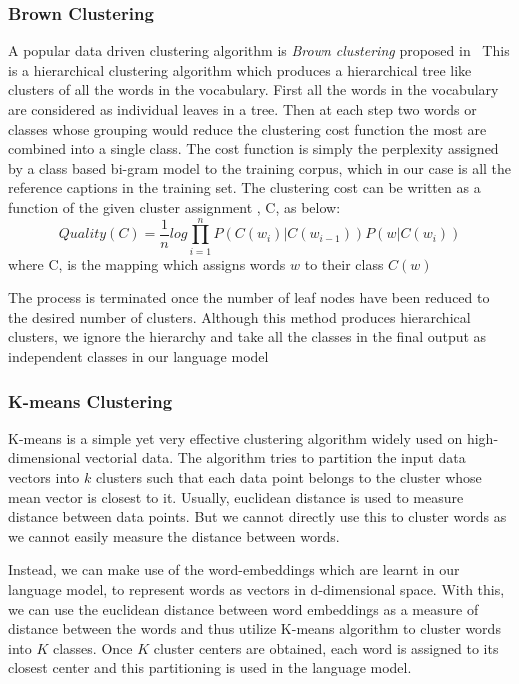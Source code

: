 \subsubsection*{Brown Clustering}
A popular data driven clustering algorithm is \emph{Brown clustering} proposed
in~\cite{BrownClust}
This is a hierarchical clustering algorithm which produces a hierarchical tree
like clusters of all the words in the vocabulary.
First all the words in the vocabulary are considered as individual leaves in a
tree. 
Then at each step two words or classes whose grouping would reduce the clustering
cost function the most are combined into a single class.
The cost function is simply the perplexity assigned by a class based bi-gram
model to the training corpus, which in our case is all the reference captions in
the training set.
The clustering cost can be written as a function of the given cluster assignment 
, C, as below: 
\begin{equation}
  \label{eq:brown} 
        Quality(C) = \frac{1}{n} log \prod_{i=1}^{n} P(C(w_i)|C(w_{i-1})) P(w|C(w_i))
\end{equation}
\noindent where C, is the mapping which assigns words $w$ to their class $C(w)$

The process is terminated once the number of leaf nodes have been reduced to the
desired number of clusters.
Although this method produces hierarchical clusters, we ignore the hierarchy
and take all the classes in the final output as independent classes
in our language model 
\subsubsection*{K-means Clustering}

K-means is a simple yet very effective clustering algorithm widely used on
high-dimensional vectorial data.
The algorithm tries to partition the input data vectors into $k$ clusters such
that each data point belongs to the cluster whose mean vector is closest to it.
Usually, euclidean distance is used to measure distance between data points.
But we cannot directly use this to cluster words as we cannot easily measure the
distance between words.

Instead, we can make use of the word-embeddings which are learnt in our language
model, to represent words as vectors in d-dimensional space.
With this, we can use the euclidean distance between word embeddings as a measure
of distance between the words and thus utilize K-means algorithm to cluster
words into $K$ classes.
Once $K$ cluster centers are obtained, each word is assigned to its closest center
and this partitioning is used in the language model.

